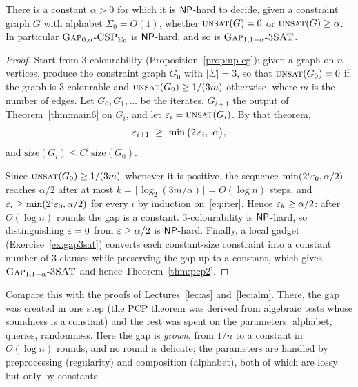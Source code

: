 \begin{theorem}\label{thm:pcp6}
There is a constant $\alpha>0$ for which it is $\mathsf{NP}$-hard to decide, given a constraint graph $G$ with alphabet $\Sigma_0=O(1)$, whether $\textsc{unsat}(G)=0$ or $\textsc{unsat}(G)\ge\alpha$.
In particular $\textsc{Gap}_{0,\alpha}\text{-}\textsc{\textsc{CSP}}_{\Sigma_0}$ is $\mathsf{NP}$-hard, and so is $\textsc{Gap}_{1,1-\alpha}\text{-}\textsc{3SAT}$.
\end{theorem}
\begin{proof}
Start from $3$-colourability (Proposition~\ref{prop:np-cg}): given a graph on $n$ vertices, produce the constraint graph $G_0$ with $|\Sigma|=3$, so that $\textsc{unsat}(G_0)=0$ if the graph is $3$-colourable and $\textsc{unsat}(G_0)\ge1/(3m)$ otherwise, where $m$ is the number of edges.
Let $G_0,G_1,\dots$ be the iterates, $G_{i+1}$ the output of Theorem~\ref{thm:main6} on $G_i$, and let $\varepsilon_i=\textsc{unsat}(G_i)$.  By that theorem,
\begin{equation}\label{eq:iter}
  \varepsilon_{i+1}\ \ge\ \min\big(2\,\varepsilon_i,\ \alpha\big),
\end{equation}
and $\mathrm{size}(G_i)\le C^i\,\mathrm{size}(G_0)$.

Since $\textsc{unsat}(G_0)\ge1/(3m)$ whenever it is positive, the sequence $\min(2^i\varepsilon_0,\alpha/2)$ reaches $\alpha/2$ after at most
$k=\lceil\log_2(3m/\alpha)\rceil=O(\log n)$ steps, and $\varepsilon_i\ge\min(2^i\varepsilon_0,\alpha/2)$ for every $i$ by induction on~\eqref{eq:iter}.
Hence $\varepsilon_k\ge\alpha/2$: after $O(\log n)$ rounds the gap is a constant.
$3$-colourability is $\mathsf{NP}$-hard, so distinguishing $\varepsilon=0$ from $\varepsilon\ge\alpha/2$ is $\mathsf{NP}$-hard.
Finally, a local gadget (Exercise~\ref{ex:gap3sat}) converts each constant-size constraint into a constant number of $3$-clauses while preserving the gap up to a constant, which gives $\textsc{Gap}_{1,1-\alpha}\text{-}\textsc{3SAT}$ and hence Theorem~\ref{thm:pcp2}.
\end{proof}

\noindent
Compare this with the proofs of Lectures~\ref{lec:as} and~\ref{lec:alm}.  There, the gap was created in one step (the PCP theorem was derived from algebraic tests whose soundness is a constant) and the rest was spent on the parameters: alphabet, queries, randomness.
Here the gap is \emph{grown}, from $1/n$ to a constant in $O(\log n)$ rounds, and no round is delicate; the parameters are handled by preprocessing (regularity) and composition (alphabet), both of which are lossy but only by constants.

